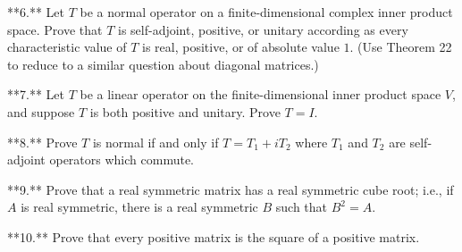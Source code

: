 **6.** Let \(T\) be a normal operator on a finite-dimensional complex inner product space. Prove that \(T\) is self-adjoint, positive, or unitary according as every characteristic value of \(T\) is real, positive, or of absolute value \(1\). (Use Theorem 22 to reduce to a similar question about diagonal matrices.)

**7.** Let \(T\) be a linear operator on the finite-dimensional inner product space \(V\), and suppose \(T\) is both positive and unitary. Prove \(T=I\).

**8.** Prove \(T\) is normal if and only if \(T=T_{1}+iT_{2}\) where \(T_{1}\) and \(T_{2}\) are self-adjoint operators which commute.

**9.** Prove that a real symmetric matrix has a real symmetric cube root; i.e., if \(A\) is real symmetric, there is a real symmetric \(B\) such that \(B^{2}=A\).

**10.** Prove that every positive matrix is the square of a positive matrix.

